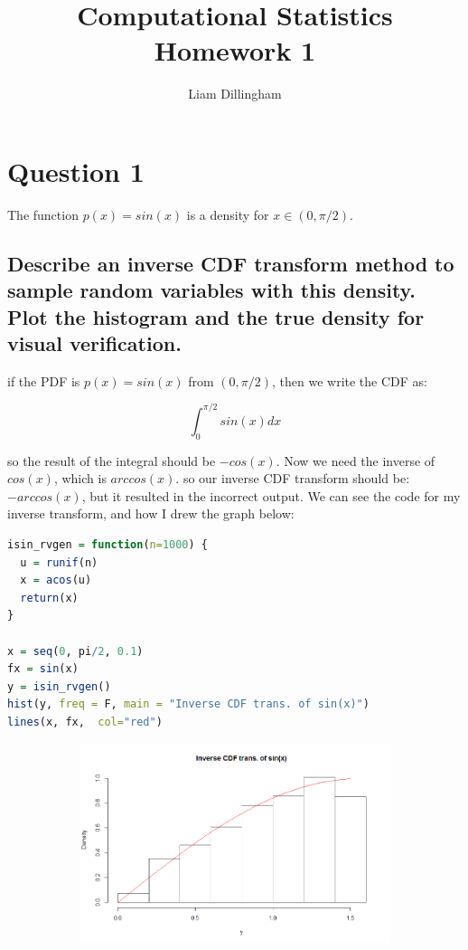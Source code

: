 \documentclass[20pt]{article} %
\title{Computational Statistics Homework 1}
\author{Liam Dillingham}
\begin{document}
\maketitle

\section{Question 1} 
The function $p(x) = sin(x)$ is a density for $x \in (0, \pi / 2)$.
\subsection{Describe an inverse CDF transform method to sample random variables with this density.  Plot the histogram and the true density for visual verification.}

if the PDF is $p(x) = sin(x)$ from $(0, \pi / 2)$, then we write the CDF as:

$$\int_{0}^{\pi / 2}sin(x)dx$$

so the result of the integral should be $-cos(x)$. Now we need the inverse of $cos(x)$, which is $arccos(x)$. so our inverse CDF transform should be: $-arccos(x)$, but it resulted in the incorrect output.  We can see the code for my inverse transform, and how I drew the graph below:

\begin{lstlisting}[language=R]
isin_rvgen = function(n=1000) {
  u = runif(n)
  x = acos(u)
  return(x)
}

x = seq(0, pi/2, 0.1)
fx = sin(x)
y = isin_rvgen()
hist(y, freq = F, main = "Inverse CDF trans. of sin(x)")
lines(x, fx,  col="red")
\end{lstlisting}

\newpage
\begin{figure}[!htbp]
  	\centering
   	\begin{subfigure}[p]{0.8\linewidth}
    	\includegraphics[width=\linewidth]{./figures/Rplot.png}
   	\end{subfigure}
\end{figure} 
\end{document}
